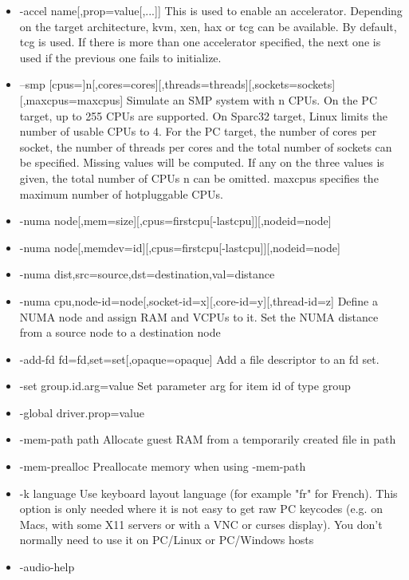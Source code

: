 \documentclass[letterpaper,10pt,fleqn]{article}
\begin{document}
\begin{itemize}
		\item-accel name[,prop=value[,...]]
           This is used to enable an accelerator. Depending on the target
           architecture, kvm, xen, hax or tcg can be available. By default, tcg
           is used. If there is more than one accelerator specified, the next
           one is used if the previous one fails to initialize.
		\item--smp
       [cpus=]n[,cores=cores][,threads=threads][,sockets=sockets][,maxcpus=maxcpus]
           Simulate an SMP system with n CPUs. On the PC target, up to 255 CPUs
           are supported. On Sparc32 target, Linux limits the number of usable
           CPUs to 4.  For the PC target, the number of cores per socket, the
           number of threads per cores and the total number of sockets can be
           specified. Missing values will be computed. If any on the three
           values is given, the total number of CPUs n can be omitted. maxcpus
           specifies the maximum number of hotpluggable CPUs.
		\item-numa node[,mem=size][,cpus=firstcpu[-lastcpu]][,nodeid=node]
		\item-numa node[,memdev=id][,cpus=firstcpu[-lastcpu]][,nodeid=node]
		\item-numa dist,src=source,dst=destination,val=distance
		\item-numa cpu,node-id=node[,socket-id=x][,core-id=y][,thread-id=z]
           Define a NUMA node and assign RAM and VCPUs to it.  Set the NUMA
           distance from a source node to a destination node
		\item-add-fd fd=fd,set=set[,opaque=opaque]
           Add a file descriptor to an fd set.
		\item-set group.id.arg=value
           Set parameter arg for item id of type group
		\item-global driver.prop=value
		\item-mem-path path
           Allocate guest RAM from a temporarily created file in path
		\item -mem-prealloc
           Preallocate memory when using -mem-path
		\item-k language
           Use keyboard layout language (for example "fr" for French). This
           option is only needed where it is not easy to get raw PC keycodes
           (e.g. on Macs, with some X11 servers or with a VNC or curses
           display). You don't normally need to use it on PC/Linux or PC/Windows
           hosts
		\item-audio-help

\end{itemize}
\end{document}
